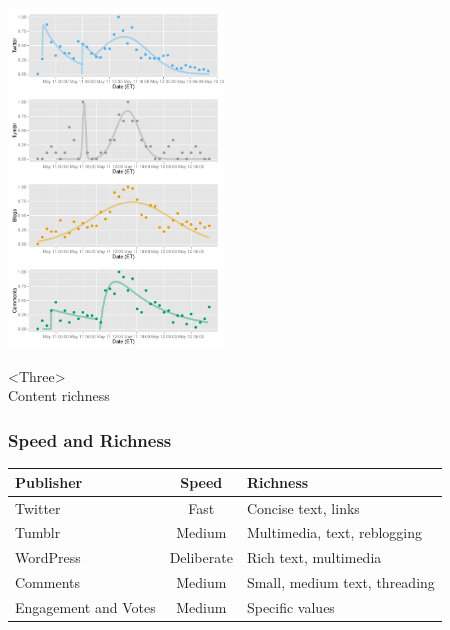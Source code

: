 \documentclass{beamer}
\begin{document}

\begin{frame}
  \begin{center}
    \includegraphics[height=9.0cm]{./imgs/JPMorgan.pdf}
  \end{center}
\end{frame}


\begin{frame}
\begin{center}
{\Huge <Three> \\ [10pt] Content richness }
\end{center}
\end{frame}


\begin{frame} \frametitle{Speed and Richness}
\begin{table}
\begin{tabular}{p{2.2cm}| c |p{5cm}}
\hline
   {Publisher}   &   {Speed} & {Richness} \\ [3pt]
\hline 
    Twitter       & Fast & Concise text, links \\ [3pt]
    Tumblr       & Medium & Multimedia, text, reblogging\\  [3pt]
    WordPress  & Deliberate &  Rich text, multimedia\\  [3pt]
    Comments  & Medium & Small, medium text, threading\\  [3pt]
    Engagement and Votes   & Medium & Specific values\\ 
\hline
\end{tabular}
\end{table}
\end{frame}
\end{document}
